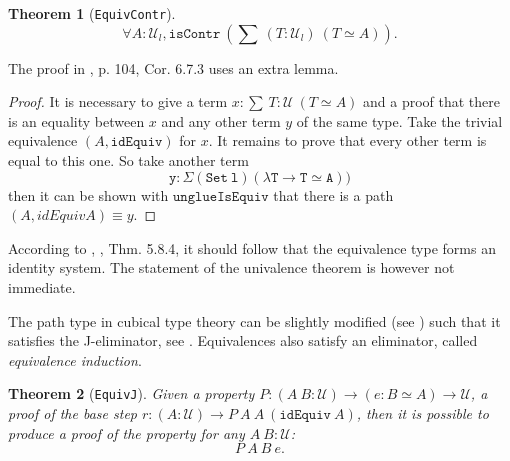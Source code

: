 \documentclass[12pt,a4paper,twoside,xetex]{book} %
\newcommand{\keyword}[1]{\emph{#1}\index{#1}}
\newtheorem{theorem}{Theorem}[section]
\newcommand{\op}[1]{\mathtt{#1}}
\newcommand{\type}{\mathcal{U}}
\begin{document}
\begin{theorem}[\texttt{EquivContr}]\label{contrSingl}
 $$\forall A : \type_l, \op{isContr} \ \left( \sum \ (T : \type_l) \  \left( T 
\simeq A \right) \right).$$ 
\end{theorem}


The proof in \cite{Huber2016}, p. 104, Cor. 6.7.3 uses an extra lemma.

\begin{proof}
It is necessary to give a term $x : \sum \ T : \type \  \left( T \simeq 
A \right)$ and a proof that there is an equality between $x$ and any other term 
$y$ of the same type. Take the trivial equivalence  $(A, \op{idEquiv})$ for 
$x$. It remains to prove that every other term is equal to this one. So take 
another term $$\op{y : Σ (Set\ l) (λ T → T ≃ A))}$$ then it can be shown with 
$\op{unglueIsEquiv}$ that there is a path $(A , idEquiv A) \equiv y$.
\end{proof}


According to \cite{Huber2016}, \cite{Voevodsky2013}, Thm. 5.8.4, it should 
follow that the equivalence type forms an identity system. The statement of the 
univalence theorem is however not immediate.

The path type in cubical type theory can be slightly modified (see 
) such that it satisfies the J-eliminator, see 
. Equivalences also satisfy an eliminator, called 
\keyword{equivalence induction}. 

\begin{theorem}[\texttt{EquivJ}]
Given a property $P: (A \ B : \mathcal{U}) \rightarrow (e : B \simeq A) 
\rightarrow \mathcal{U}$, a proof of the base step $r : (A : \mathcal{U}) 
\rightarrow P \ A\ A \ (\texttt{idEquiv} \ A)$, then it is possible to produce 
a proof of the property for any $A \ B: \mathcal{U}$: $$ P\  A \ B\ e.$$
\end{theorem}
\end{document}
